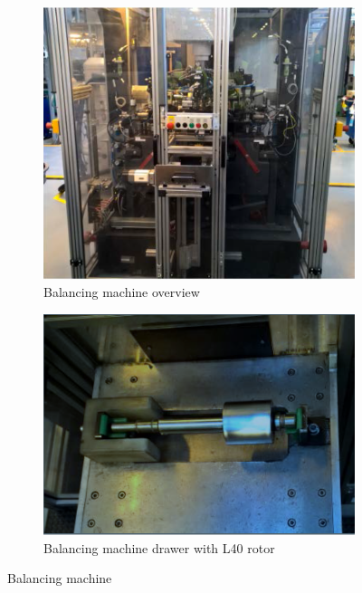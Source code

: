 \begin{figure}[h]
\centering
    \begin{subfigure}{.49\textwidth}
        \centering
        \includegraphics[width=\textwidth]{InitialProblemstatement/Case/balancing.PNG} 
        \caption{Balancing machine overview}
        \label{fig:balancing}
    \end{subfigure}
    \begin{subfigure}{.49\textwidth}
        \centering
        \includegraphics[width=\textwidth]{InitialProblemstatement/Case/Rotor.PNG}
        \caption{Balancing machine drawer with L40 rotor}
        \label{fig:Rotor} 
    \end{subfigure}
\caption{Balancing machine\cite{Case}}
\label{fig:BalancingMachine}
\end{figure}

